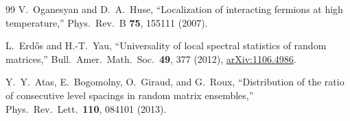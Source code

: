 \documentclass[aps,prd,twocolumn,superscriptaddress,nofootinbib]{revtex4-2}
\begin{document}
\begin{thebibliography}{99}
V.~Oganesyan and D.~A.~Huse,
``Localization of interacting fermions at high temperature,''
Phys.\ Rev.\ B \textbf{75}, 155111 (2007).

L.~Erd\H{o}s and H.-T.~Yau,
``Universality of local spectral statistics of random matrices,''
Bull.\ Amer.\ Math.\ Soc.\ \textbf{49}, 377 (2012),
\href{https://arxiv.org/abs/1106.4986}{arXiv:1106.4986}.

Y.~Y.~Atas, E.~Bogomolny, O.~Giraud, and G.~Roux,
``Distribution of the ratio of consecutive level spacings in random matrix ensembles,''
Phys.\ Rev.\ Lett.\ \textbf{110}, 084101 (2013).

\end{thebibliography}
\end{document}
